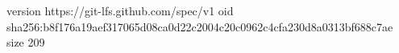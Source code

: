 version https://git-lfs.github.com/spec/v1
oid sha256:b8f176a19aef317065d08ca0d22c2004c20c0962c4cfa230d8a0313bf688c7ae
size 209
